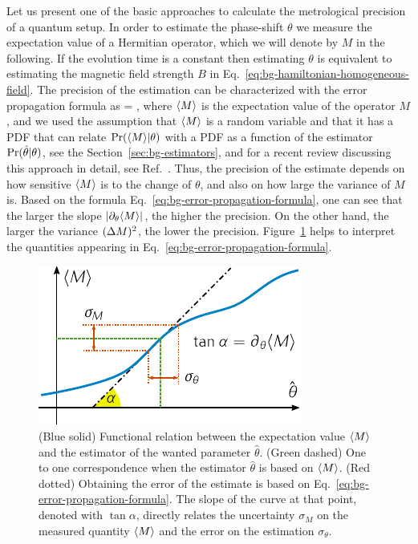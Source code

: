 Let us present one of the basic approaches to calculate the metrological precision of a quantum setup.
In order to estimate the phase-shift $\theta$ we measure the expectation value of a Hermitian operator, which we will denote by $M$ in the following.
If the evolution time is a constant then estimating $\theta$ is equivalent to estimating the magnetic field strength $B$ in Eq.~\eqref{eq:bg-hamiltonian-homogeneous-field}.
The precision of the estimation can be characterized with the error propagation formula as
\be
  \label{eq:bg-error-propagation-formula}
  \varian{\theta} = ,
\ee
where $\langle M \rangle$ is the expectation value of the operator $M$, and we used the assumption that $\langle M \rangle$ is a random variable and that it has a PDF that can relate $\text{Pr}(\langle M \rangle|\theta)$ with a PDF as a function of the estimator $\text{Pr}(\hat{\theta}|\theta)$, see the Section~\ref{sec:bg-estimators}, and for a recent review discussing this approach in detail, see Ref.~\citep{Kolodynski2010}.
Thus, the precision of the estimate depends on how sensitive $\langle M \rangle$ is to the change of $\theta$, and also on how large the variance of $M$ is.
Based on the formula Eq.~\eqref{eq:bg-error-propagation-formula}, one can see that the larger the slope $|\partial_\theta \langle M \rangle|$, the higher the precision.
On the other hand, the larger the variance $(\Delta M )^2$, the lower the precision.
Figure~\ref{fig:bg-expect-m-evo} helps to interpret the quantities appearing in Eq.~\eqref{eq:bg-error-propagation-formula}.
\begin{figure}[htp]
  \centering
  \includegraphics[scale=1.2]{img/BG_expect_m_evo.pdf}
  \caption[Graphical explanation of the error-propagation formula]{(Blue solid) Functional relation between the expectation value $\langle M \rangle$ and the estimator of the wanted parameter $\hat\theta$.
  (Green dashed) One to one correspondence when the estimator $\hat{\theta}$ is based on $\langle M \rangle$. (Red dotted) Obtaining the error of the estimate is based on Eq.~\eqref{eq:bg-error-propagation-formula}.
  The slope of the curve at that point, denoted with $\tan\alpha$, directly relates the uncertainty $\sigma_M$ on the measured quantity $\langle M \rangle$ and the error on the estimation $\sigma_\theta$.}
  \label{fig:bg-expect-m-evo}
\end{figure}

